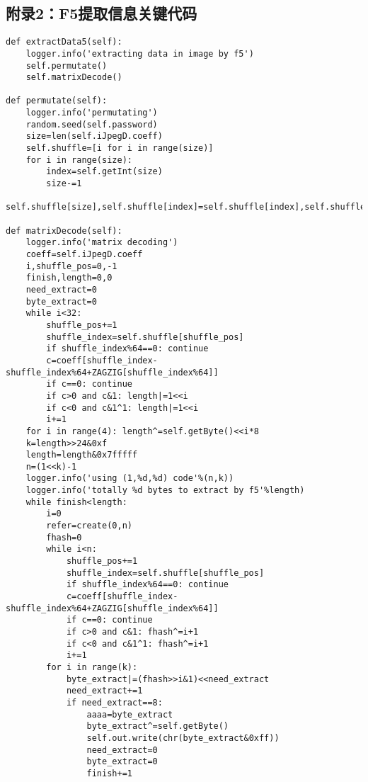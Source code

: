 \documentclass[onecolumn,a4paper,12pt]{article}
\begin{document}
\subsection*{附录2：F5提取信息关键代码}
\begin{lstlisting}
def extractData5(self):
    logger.info('extracting data in image by f5')
    self.permutate()
    self.matrixDecode()

def permutate(self):
    logger.info('permutating')
    random.seed(self.password)
    size=len(self.iJpegD.coeff)
    self.shuffle=[i for i in range(size)]
    for i in range(size):
        index=self.getInt(size)
        size-=1
        self.shuffle[size],self.shuffle[index]=self.shuffle[index],self.shuffle[size]

def matrixDecode(self):
    logger.info('matrix decoding')
    coeff=self.iJpegD.coeff
    i,shuffle_pos=0,-1
    finish,length=0,0
    need_extract=0
    byte_extract=0
    while i<32:
        shuffle_pos+=1
        shuffle_index=self.shuffle[shuffle_pos]
        if shuffle_index%64==0: continue
        c=coeff[shuffle_index-shuffle_index%64+ZAGZIG[shuffle_index%64]]
        if c==0: continue
        if c>0 and c&1: length|=1<<i
        if c<0 and c&1^1: length|=1<<i
        i+=1
    for i in range(4): length^=self.getByte()<<i*8
    k=length>>24&0xf
    length=length&0x7fffff
    n=(1<<k)-1
    logger.info('using (1,%d,%d) code'%(n,k))
    logger.info('totally %d bytes to extract by f5'%length)
    while finish<length:
        i=0
        refer=create(0,n)
        fhash=0
        while i<n:
            shuffle_pos+=1
            shuffle_index=self.shuffle[shuffle_pos]
            if shuffle_index%64==0: continue
            c=coeff[shuffle_index-shuffle_index%64+ZAGZIG[shuffle_index%64]]
            if c==0: continue
            if c>0 and c&1: fhash^=i+1
            if c<0 and c&1^1: fhash^=i+1
            i+=1
        for i in range(k):
            byte_extract|=(fhash>>i&1)<<need_extract
            need_extract+=1
            if need_extract==8:
                aaaa=byte_extract
                byte_extract^=self.getByte()
                self.out.write(chr(byte_extract&0xff))
                need_extract=0
                byte_extract=0
                finish+=1
\end{lstlisting}
\end{document}
